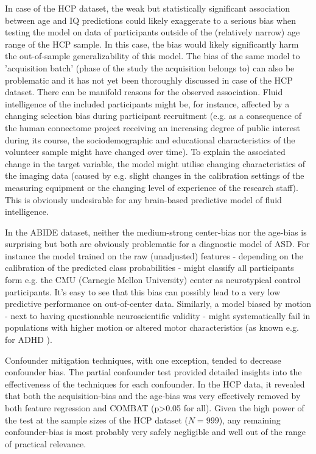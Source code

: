 \documentclass{article}
\begin{document}
In case of the HCP dataset, the weak but statistically significant association between age and IQ predictions could likely exaggerate to a serious bias when testing the model on data of participants outside of the (relatively narrow)
age range of the HCP sample. In this case, the bias would likely significantly harm the out-of-sample generalizability of this model. The bias of the same model to 'acquisition batch' (phase of the study the acquisition belongs to) can also be problematic and it has not yet been thoroughly discussed in case of the HCP dataset. There can be manifold reasons for the observed association. Fluid intelligence of the included participants might be, for instance, affected by a changing selection bias during participant recruitment (e.g. as a consequence of the human connectome project receiving an increasing degree of public interest during its course, the sociodemographic and educational characteristics of the volunteer sample might have changed over time). To explain the associated change in the target variable, the model might utilise changing characteristics of the imaging data (caused by e.g. slight changes in the calibration settings of the measuring equipment or the changing level of experience of the research staff). This is obviously undesirable for any brain-based predictive model of fluid intelligence.

In the ABIDE dataset, neither the medium-strong center-bias nor the age-bias is surprising but both are obviously problematic for a diagnostic model of ASD. For instance the model trained on the raw (unadjusted) features - depending on the calibration of the predicted class probabilities - might classify all participants form e.g. the CMU (Carnegie Mellon University) center as neurotypical control participants. It's easy to see that this bias can possibly lead to a very low predictive performance on out-of-center data. Similarly, a model biased by motion - next to having questionable neuroscientific validity - might systematically fail in populations with higher motion or altered motor characteristics (as known e.g. for ADHD \citep{eloyan2012automated}).

Confounder mitigation techniques, with one exception, tended to decrease confounder bias. The partial confounder test provided detailed insights into the effectiveness of the techniques for each confounder. In the HCP data, it revealed that both the acquisition-bias and the age-bias was very effectively removed by both feature regression and COMBAT (p>0.05 for all). Given the high power of the test at the sample sizes of the HCP dataset ($N=999$), any remaining confounder-bias is most probably very safely negligible and well out of the range of practical relevance.
\end{document}

